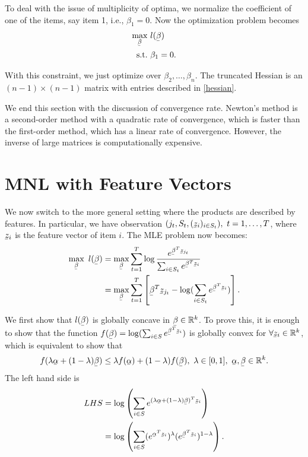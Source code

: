 \documentclass[11pt]{article}
\newcommand{\ubar}[1]{\underaccent{\bar}{#1}}
\begin{document}
To deal with the issue of multiplicity of optima, we normalize the coefficient of one of the items, say item 1, i.e., $\beta_1=0$. Now the optimization problem becomes 
\begin{align*}
\max_{\ubar \beta} \ & l(\ubar \beta) \\
\text{s.t.} \ & \beta_1=0.
\end{align*}

With this constraint, we just optimize over $\beta_2,\ldots,\beta_n$. The truncated Hessian is an $(n-1)\times (n-1)$ matrix with entries described in \ref{hessian}.

We end this section with the discussion of convergence rate. Newton's method is a second-order method with a quadratic rate of convergence, which is faster than the first-order method, which has a linear rate of convergence. However, the inverse of large matrices is computationally expensive.

\section{MNL with Feature Vectors}
\label{general}
We now switch to the more general setting where the products are described by features. In particular, we have observation $(j_t,S_t,(\ubar z_i)_{i\in S_t}), \ t=1,\ldots,T$, where $\ubar z_i$ is the feature vector of item $i$. The MLE problem now becomes:
\begin{align*}
\max_{\ubar \beta} \ l(\ubar \beta) &= \max_{\ubar \beta} \sum_{t=1}^T \log \frac{e^{\ubar \beta^T \ubar z_{j_t}}}{\sum_{i \in S_t}e^{\ubar \beta^T \ubar z_i}}\\
&=\max_{\ubar \beta} \sum_{t=1}^T \left[  \ubar \beta^T \ubar z_{j_t}-\log (\sum_{i \in S_t}e^{\ubar \beta^T \ubar z_i}) \right].
\end{align*}

We first show that $l(\ubar \beta) $ is globally concave in $\ubar \beta \in \mathbb{R}^k$. To prove this, it is enough to show that the function $f(\ubar \beta )=\log(\sum_{i\in S}e^{\ubar \beta^T \ubar z_i})$ is globally convex for $\forall \ubar z_i \in \mathbb{R}^k$, which is equivalent to show that
$$f(\lambda \ubar \alpha+(1-\lambda)\ubar \beta)\leq \lambda f(\ubar \alpha)+(1-\lambda)f(\ubar \beta), \ \lambda\in[0,1], \ \ubar \alpha,\ubar \beta\in \mathbb{R}^k.$$
The left hand side is
\begin{align*}
LHS&=\log \left( \sum_{i\in S} e^{(\lambda \ubar \alpha+(1-\lambda)\ubar \beta)^T\ubar z_i}\right)\\
&=\log \left(\sum_{i\in S}(e^{\ubar \alpha^T \ubar z_i})^{\lambda}(e^{\ubar \beta^T \ubar z_i})^{1-\lambda}\right).
\end{align*}
\end{document}

